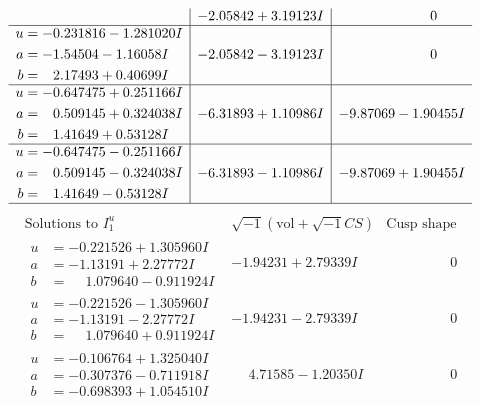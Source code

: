 \documentclass[1p]{elsarticle_modified}
\theoremstyle{definition}
\newcommand{\I}{\sqrt{-1}}
\begin{document}
$$\begin{array}{c|c|c}
 & -2.05842 + 3.19123 I & \phantom{-0.000000 } 0 \\ \hline\begin{aligned}
u &= -0.231816 - 1.281020 I \\
a &= -1.54504 - 1.16058 I \\
b &= \phantom{-}2.17493 + 0.40699 I\end{aligned}
 & -2.05842 - 3.19123 I & \phantom{-0.000000 } 0 \\ \hline\begin{aligned}
u &= -0.647475 + 0.251166 I \\
a &= \phantom{-}0.509145 + 0.324038 I \\
b &= \phantom{-}1.41649 + 0.53128 I\end{aligned}
 & -6.31893 + 1.10986 I & -9.87069 - 1.90455 I \\ \hline\begin{aligned}
u &= -0.647475 - 0.251166 I \\
a &= \phantom{-}0.509145 - 0.324038 I \\
b &= \phantom{-}1.41649 - 0.53128 I\end{aligned}
 & -6.31893 - 1.10986 I & -9.87069 + 1.90455 I\\
 \hline 
 \end{array}$$\newpage$$\begin{array}{c|c|c}  
\text{Solutions to }I^u_{1}& \I (\text{vol} + \sqrt{-1}CS) & \text{Cusp shape}\\
 \hline 
\begin{aligned}
u &= -0.221526 + 1.305960 I \\
a &= -1.13191 + 2.27772 I \\
b &= \phantom{-}1.079640 - 0.911924 I\end{aligned}
 & -1.94231 + 2.79339 I & \phantom{-0.000000 } 0 \\ \hline\begin{aligned}
u &= -0.221526 - 1.305960 I \\
a &= -1.13191 - 2.27772 I \\
b &= \phantom{-}1.079640 + 0.911924 I\end{aligned}
 & -1.94231 - 2.79339 I & \phantom{-0.000000 } 0 \\ \hline\begin{aligned}
u &= -0.106764 + 1.325040 I \\
a &= -0.307376 - 0.711918 I \\
b &= -0.698393 + 1.054510 I\end{aligned}
 & \phantom{-}4.71585 - 1.20350 I & \phantom{-0.000000 } 0 \\ \hline\begin{aligned}

\end{aligned}
\end{array}$$
\end{document}
